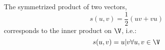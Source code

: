 \begin{lemma}\label{l:inner-product}
	The symmetrized product of two vectors, \[s(u,v) = \frac{1}{2}(uv + vu)\] corresponds to the inner product on $\V$, i.e.: \[s(u,v) = u|v \forall u,v \in \V\]
\end{lemma}
